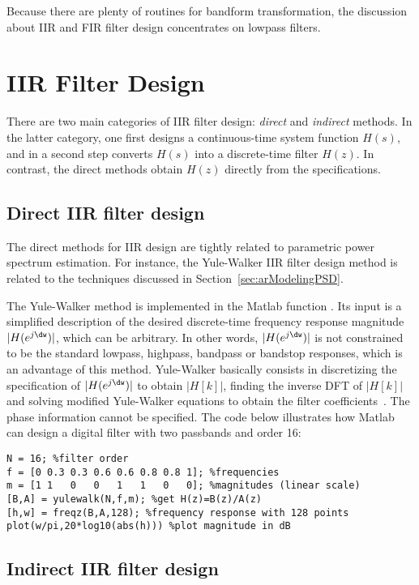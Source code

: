 Because there are plenty of routines for bandform transformation, the discussion about IIR and
FIR filter design concentrates on lowpass filters.

\section{IIR Filter Design}
\label{sec:iirFilters}

There are two main categories of IIR filter design: \emph{direct} and \emph{indirect} methods. In the latter category, one first designs a continuous-time system function $H(s)$, and in a second step converts $H(s)$ into a discrete-time filter $H(z)$. In contrast, the direct methods obtain $H(z)$ directly from the specifications.

\subsection{Direct IIR filter design}

The direct methods for IIR design are tightly related to parametric power spectrum estimation. For instance, the Yule-Walker  IIR filter design method is related to the techniques discussed in Section~\ref{sec:arModelingPSD}.

The Yule-Walker method is implemented in the Matlab function . Its input is a simplified description of the desired discrete-time frequency response magnitude $|H(e^{j\dw})|$, which can be arbitrary. In other words, $|H(e^{j\dw})|$ is not constrained to be the standard lowpass, highpass, bandpass or bandstop responses, which is an advantage of this method. Yule-Walker basically consists in discretizing the specification of $|H(e^{j\dw})|$ to obtain $|H[k]|$, finding the inverse DFT of $|H[k]|$ and solving modified Yule-Walker equations to obtain the filter coefficients~\cite{Friedlander84}. The phase information cannot be specified. The code below illustrates how Matlab can design a digital filter with two passbands and order 16:
\begin{lstlisting}
N = 16; %filter order
f = [0 0.3 0.3 0.6 0.6 0.8 0.8 1]; %frequencies
m = [1 1   0   0   1   1   0   0]; %magnitudes (linear scale)
[B,A] = yulewalk(N,f,m); %get H(z)=B(z)/A(z)
[h,w] = freqz(B,A,128); %frequency response with 128 points
plot(w/pi,20*log10(abs(h))) %plot magnitude in dB
\end{lstlisting}

\subsection{Indirect IIR filter design}

